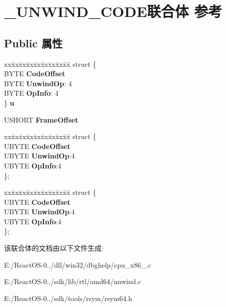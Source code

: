 \hypertarget{union___u_n_w_i_n_d___c_o_d_e}{}\section{\+\_\+\+U\+N\+W\+I\+N\+D\+\_\+\+C\+O\+D\+E联合体 参考}
\label{union___u_n_w_i_n_d___c_o_d_e}
\subsection*{Public 属性}
\begin{DoxyCompactItemize}
\item 
\mbox{\label{union___u_n_w_i_n_d___c_o_d_e_a9c68fa1ac352fb94ecf51f8344412265}} 
\begin{tabbing}
xx\=xx\=xx\=xx\=xx\=xx\=xx\=xx\=xx\=\kill
struct \{\\
\>BYTE {\bfseries CodeOffset}\\
\>BYTE {\bfseries UnwindOp}: 4\\
\>BYTE {\bfseries OpInfo}: 4\\
\} {\bfseries u}\\

\end{tabbing}\item 
\mbox{\label{union___u_n_w_i_n_d___c_o_d_e_a8b3fd03b3891cca11747701d2174998c}} 
U\+S\+H\+O\+RT {\bfseries Frame\+Offset}
\item 
\mbox{\label{union___u_n_w_i_n_d___c_o_d_e_a3895be34dd83f8dc53b9e0611941ae04}} 
\begin{tabbing}
xx\=xx\=xx\=xx\=xx\=xx\=xx\=xx\=xx\=\kill
struct \{\\
\>UBYTE {\bfseries CodeOffset}\\
\>UBYTE {\bfseries UnwindOp}:4\\
\>UBYTE {\bfseries OpInfo}:4\\
\}; \\

\end{tabbing}\item 
\mbox{\label{union___u_n_w_i_n_d___c_o_d_e_a236c5e2d6deca5ff2b2e594347145812}} 
\begin{tabbing}
xx\=xx\=xx\=xx\=xx\=xx\=xx\=xx\=xx\=\kill
struct \{\\
\>UBYTE {\bfseries CodeOffset}\\
\>UBYTE {\bfseries UnwindOp}:4\\
\>UBYTE {\bfseries OpInfo}:4\\
\}; \\

\end{tabbing}\end{DoxyCompactItemize}


该联合体的文档由以下文件生成\+:\begin{DoxyCompactItemize}
\item 
E\+:/\+React\+O\+S-\/0../dll/win32/dbghelp/cpu\+\_\+x86\+\_.\+c\item 
E\+:/\+React\+O\+S-\/0../sdk/lib/rtl/amd64/unwind.\+c\item 
E\+:/\+React\+O\+S-\/0../sdk/tools/rsym/rsym64.\+h\end{DoxyCompactItemize}
